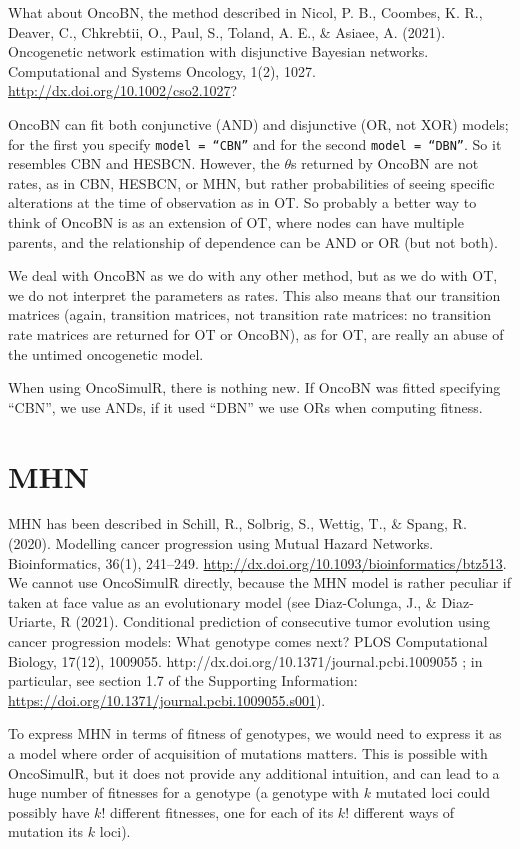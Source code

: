\documentclass[11pt]{article}
\begin{document}
What about OncoBN, the method described in Nicol, P. B., Coombes, K. R., Deaver, C., Chkrebtii, O., Paul, S., Toland, A. E., \& Asiaee, A. (2021). Oncogenetic network estimation with disjunctive Bayesian networks. Computational and Systems Oncology, 1(2), 1027. \url{http://dx.doi.org/10.1002/cso2.1027}?

OncoBN can fit both conjunctive (AND) and disjunctive (OR, not XOR) models; for the first you specify \texttt{model = ``CBN''} and for the second \texttt{model = ``DBN''}. So it resembles CBN and HESBCN. However, the $\theta$s returned by OncoBN are not rates, as in CBN, HESBCN, or MHN, but rather probabilities of seeing specific alterations at the time of observation as in OT. So probably a better way to think of OncoBN is as an extension of OT, where nodes can have multiple parents, and the relationship of dependence can be AND or OR (but not both).

We deal with OncoBN as we do with any other method, but as we do with OT, we do not interpret the parameters as rates. This also means that our transition matrices (again, transition matrices, not transition rate matrices: no transition rate matrices are returned for OT or OncoBN), as for OT, are really an abuse of the untimed oncogenetic model.

When using OncoSimulR, there is nothing new. If OncoBN was fitted specifying  ``CBN'', we use ANDs, if it used ``DBN'' we use ORs when computing fitness. 



\section{MHN}\label{MHN}

MHN has been described in Schill, R., Solbrig, S., Wettig, T., \& Spang, R. (2020). Modelling cancer progression using Mutual Hazard Networks. Bioinformatics, 36(1), 241–249. \url{http://dx.doi.org/10.1093/bioinformatics/btz513}. We cannot use OncoSimulR directly, because the MHN model is rather peculiar if taken at face value as an evolutionary model (see Diaz-Colunga, J., \& Diaz-Uriarte, R (2021). Conditional prediction of consecutive tumor evolution using cancer progression models: What genotype comes next? PLOS Computational Biology, 17(12), 1009055. http://dx.doi.org/10.1371/journal.pcbi.1009055 ; in particular, see section 1.7 of the Supporting Information: \url{https://doi.org/10.1371/journal.pcbi.1009055.s001}).

To express MHN in terms of fitness of genotypes, we would need to express it as a model where order of acquisition of mutations matters. This is possible with OncoSimulR, but it does not provide any additional intuition, and can lead to a huge number of fitnesses for a genotype (a genotype with $k$ mutated loci could possibly have $k!$ different fitnesses, one for each of its $k!$ different ways of mutation its $k$ loci).
\end{document}
